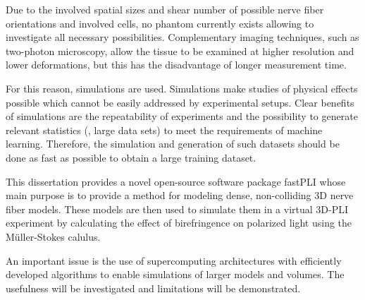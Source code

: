 Due to the involved spatial sizes and shear number of possible nerve fiber orientations and involved cells, no phantom currently exists allowing to investigate all necessary possibilities.
Complementary imaging techniques, such as two-photon microscopy, allow the tissue to be examined at higher resolution and lower deformations, but this has the disadvantage of longer measurement time.
\par
% 
For this reason, simulations are used.
Simulations make studies of physical effects possible which cannot be easily addressed by experimental setups.
Clear benefits of simulations are the repeatability of experiments and the possibility to generate relevant statistics (\ie{}, large data sets) to meet \eg{} the requirements of machine learning.
Therefore, the simulation and generation of such datasets should be done as fast as possible to obtain a large training dataset. \\
\cite{Ginsburger2018, ginsburgerDis2019, Callaghan2019, Menzel2020}
\par
%
This dissertation provides a novel open-source software package \ac{fastPLI} whose main purpose is to provide a method for modeling dense, non-colliding 3D nerve fiber models.
These models are then used to simulate them in a virtual \ac{3D-PLI} experiment by calculating the effect of birefringence on polarized light using the M{\"u}ller-Stokes calulus. \\
\cite{Matuschke2019, Matuschke2021, Reuter2019}
\par
% 
An important issue is the use of supercomputing architectures with efficiently developed algorithms to enable simulations of larger models and volumes.
The usefulness will be investigated and limitations will be demonstrated.
